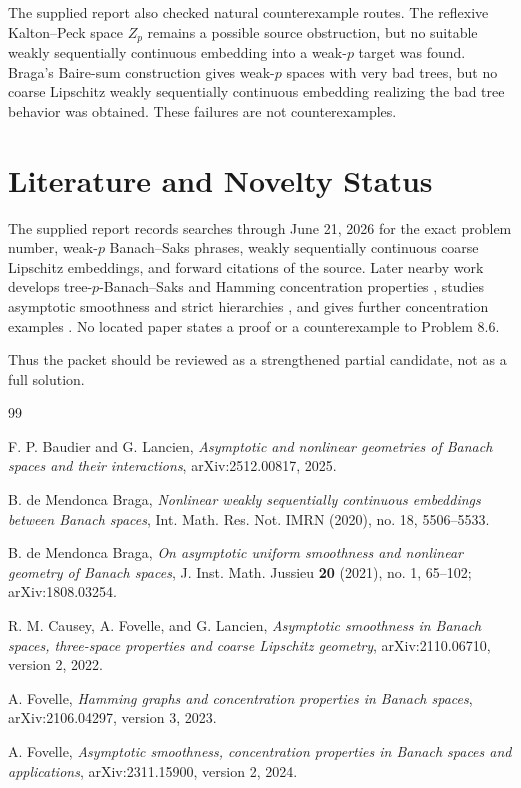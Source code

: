 \documentclass[11pt]{article}
\begin{document}
The supplied report also checked natural counterexample routes.  The reflexive
Kalton--Peck space \(Z_p\) remains a possible source obstruction, but no
suitable weakly sequentially continuous embedding into a weak-\(p\) target was
found.  Braga's Baire-sum construction gives weak-\(p\) spaces with very bad
trees, but no coarse Lipschitz weakly sequentially continuous embedding
realizing the bad tree behavior was obtained.  These failures are not
counterexamples.

\section*{Literature and Novelty Status}

The supplied report records searches through June 21, 2026 for the exact
problem number, weak-\(p\) Banach--Saks phrases, weakly sequentially continuous
coarse Lipschitz embeddings, and forward citations of the source.  Later
nearby work develops tree-\(p\)-Banach--Saks and Hamming concentration
properties \cite{FovelleHamming}, studies asymptotic smoothness and strict
hierarchies \cite{CauseyFovelleLancien}, and gives further concentration
examples \cite{FovelleSmoothness}.  No located paper states a proof or a
counterexample to Problem 8.6.

Thus the packet should be reviewed as a strengthened partial candidate, not as
a full solution.

\begin{thebibliography}{99}

F. P. Baudier and G. Lancien,
\emph{Asymptotic and nonlinear geometries of Banach spaces and their interactions},
arXiv:2512.00817, 2025.

B. de Mendonca Braga,
\emph{Nonlinear weakly sequentially continuous embeddings between Banach spaces},
Int. Math. Res. Not. IMRN (2020), no. 18, 5506--5533.

B. de Mendonca Braga,
\emph{On asymptotic uniform smoothness and nonlinear geometry of Banach spaces},
J. Inst. Math. Jussieu \textbf{20} (2021), no. 1, 65--102;
arXiv:1808.03254.

R. M. Causey, A. Fovelle, and G. Lancien,
\emph{Asymptotic smoothness in Banach spaces, three-space properties and coarse Lipschitz geometry},
arXiv:2110.06710, version 2, 2022.

A. Fovelle,
\emph{Hamming graphs and concentration properties in Banach spaces},
arXiv:2106.04297, version 3, 2023.

A. Fovelle,
\emph{Asymptotic smoothness, concentration properties in Banach spaces and applications},
arXiv:2311.15900, version 2, 2024.

\end{thebibliography}
\end{document}
